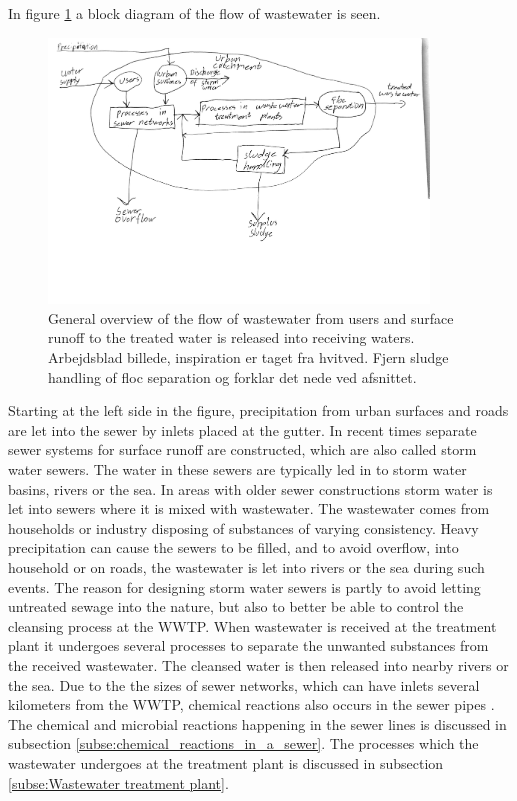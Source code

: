 In figure \ref{fig:sewer_overview_of_the_different_parts} a block diagram of the flow of wastewater is seen.
\begin{figure}[H]
\centering
\includegraphics[width=0.9\textwidth]{report/introduction/pictures/sewer_process2.pdf}
\caption{General overview of the flow of wastewater from users and surface runoff to the treated water is released into receiving waters. Arbejdsblad billede, inspiration er taget fra hvitved. Fjern sludge handling of floc separation og forklar det nede ved afsnittet.}
\label{fig:sewer_overview_of_the_different_parts}
\end{figure}

Starting at the left side in the figure, precipitation from urban surfaces and roads are let into the sewer by inlets placed at the gutter. In recent times separate sewer systems for surface runoff are constructed, which are also called storm water sewers. The water in these sewers are typically led in to storm water basins, rivers or the sea. In areas with older sewer constructions storm water is let into sewers where it is mixed with wastewater. The wastewater comes from households or industry disposing of substances of varying consistency. Heavy precipitation can cause the sewers to be filled, and to avoid overflow, into household or on roads, the wastewater is let into rivers or the sea during such events. 
The reason for designing storm water sewers is partly to avoid letting untreated sewage into the nature, but also to better be able to control the cleansing process at the WWTP. %
When wastewater is received at the treatment plant it undergoes several processes to separate the unwanted substances from the received wastewater. The cleansed water is then released into nearby rivers or the sea.
Due to the the sizes of sewer networks, which can have inlets several kilometers from the WWTP, chemical reactions also occurs in the sewer pipes \cite{Sewer_processes}.
The chemical and microbial reactions happening in the sewer lines is discussed in subsection \ref{subse:chemical_reactions_in_a_sewer}. The processes which the wastewater undergoes at the treatment plant is discussed in subsection \ref{subse:Wastewater treatment plant}.  

